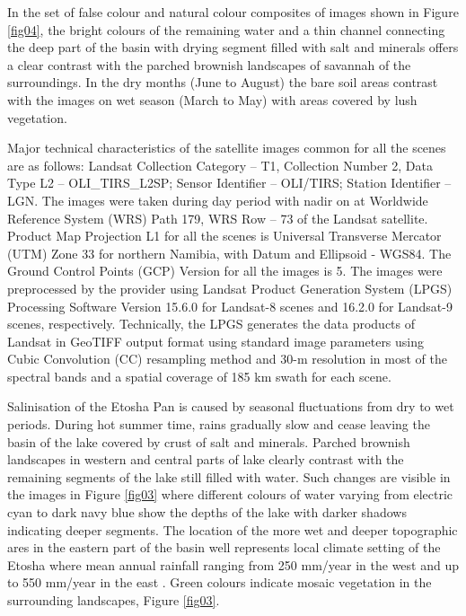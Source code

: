 \documentclass[draft]{agujournal2019}
\begin{document}
In the set of false colour and natural colour composites of images shown in Figure \ref{fig04}, the bright colours of the remaining water and a thin channel connecting the deep part of the basin with drying segment filled with salt and minerals offers a clear contrast with the parched brownish landscapes of savannah of the surroundings. In the dry months (June to August) the bare soil areas contrast with the images on wet season (March to May) with areas covered by lush vegetation. 

Major technical characteristics of the satellite images common for all the scenes are as follows: Landsat Collection Category -- T1, Collection Number 2, Data Type L2 -- OLI\_TIRS\_L2SP; Sensor Identifier -- OLI/TIRS; Station Identifier -- LGN. The images were taken during day period with nadir on at Worldwide Reference System (WRS) Path 179, WRS Row -- 73 of the Landsat satellite. Product Map Projection L1 for all the scenes is Universal Transverse Mercator (UTM) Zone 33 for northern Namibia, with Datum and Ellipsoid - WGS84. The Ground Control Points (GCP) Version for all the images is 5. The images were preprocessed by the provider using Landsat Product Generation System (LPGS) Processing Software Version 15.6.0 for Landsat-8 scenes and 16.2.0 for Landsat-9 scenes, respectively. Technically, the LPGS generates the data products of Landsat in GeoTIFF output format using standard image parameters using Cubic Convolution (CC) resampling method and 30-m resolution in most of the spectral bands and a spatial coverage of 185 km swath for each scene. 

Salinisation of the Etosha Pan is caused by seasonal fluctuations from dry to wet periods. During hot summer time, rains gradually slow and cease leaving the basin of the lake covered by crust of salt and minerals. Parched brownish landscapes in western and central parts of lake clearly contrast with the remaining segments of the lake still filled with water. Such changes are visible in the images in Figure \ref{fig03} where different colours of water varying from electric cyan to dark navy blue show the depths of the lake with darker shadows indicating deeper segments. The location of the more wet and deeper topographic ares in the eastern part of the basin well represents local climate setting of the Etosha where mean annual rainfall ranging from 250 mm/year in the west and up to 550 mm/year in the east \cite{Koeniger}. Green colours indicate mosaic vegetation in the surrounding landscapes, Figure \ref{fig03}. 
\end{document}
